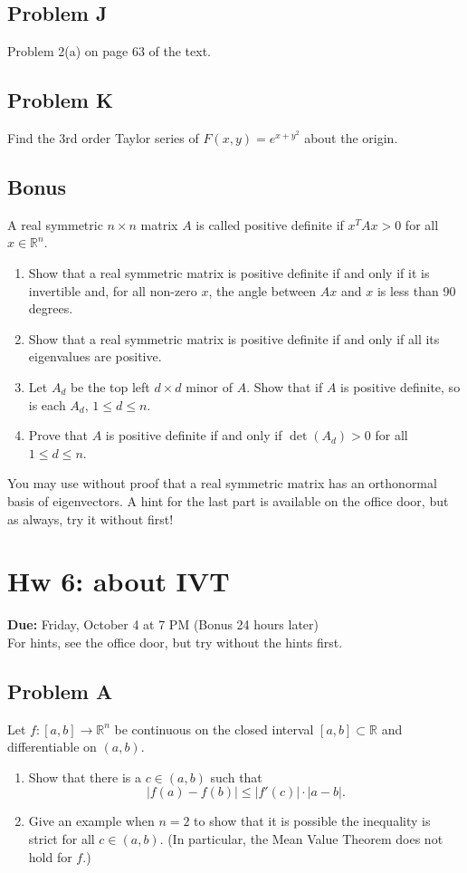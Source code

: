 \documentclass[lang=cn,11pt]{template}
\begin{document}
\section*{Problem J}
Problem 2(a) on page 63 of the text.

\section*{Problem K}
Find the 3rd order Taylor series of $F(x, y) = e^{x + y^2}$ about the origin.

\section*{Bonus}
A real symmetric $n \times n$ matrix $A$ is called positive definite if $x^T A x > 0$ for all $x \in \mathbb{R}^n$.
\begin{enumerate}
    \item Show that a real symmetric matrix is positive definite if and only if it is invertible and, for all non-zero $x$, the angle between $Ax$ and $x$ is less than 90 degrees.
    \item Show that a real symmetric matrix is positive definite if and only if all its eigenvalues are positive.
    \item Let $A_d$ be the top left $d \times d$ minor of $A$. Show that if $A$ is positive definite, so is each $A_d$, $1 \leq d \leq n$.
    \item Prove that $A$ is positive definite if and only if $\det(A_d) > 0$ for all $1 \leq d \leq n$.
\end{enumerate}

You may use without proof that a real symmetric matrix has an orthonormal basis of eigenvectors. A hint for the last part is available on the office door, but as always, try it without first!

\chapter*{Hw 6: about IVT}

\noindent
\textbf{Due:} Friday, October 4 at 7 PM (Bonus 24 hours later)\\
For hints, see the office door, but try without the hints first.

\section*{Problem A}
Let $f : [a, b] \to \mathbb{R}^n$ be continuous on the closed interval $[a, b] \subset \mathbb{R}$ and differentiable on $(a, b)$.
\begin{enumerate}
    \item Show that there is a $c \in (a, b)$ such that
    \[
    |f(a) - f(b)| \leq |f'(c)| \cdot |a - b|.
    \]
    \item Give an example when $n = 2$ to show that it is possible the inequality is strict for all $c \in (a, b)$. (In particular, the Mean Value Theorem does not hold for $f$.)
\end{enumerate}
\end{document}
